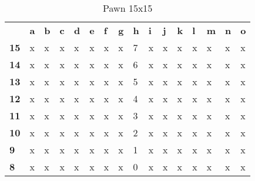 \documentclass{article}
\begin{document}
\begin{table}[H]
\centering
\caption{Pawn 15x15}
\label{my-label}
\begin{tabular}{llllllllllllllll}
                                 & \textbf{a} & \textbf{b} & \textbf{c} & \textbf{d} & \textbf{e} & \textbf{f} & \textbf{g} & \textbf{h} & \textbf{i} & \textbf{j} & \textbf{k} & \textbf{l} & \textbf{m} & \textbf{n} & \textbf{o} \\ \cline{2-16} 
\multicolumn{1}{l|}{\textbf{15}} & x          & x          & x          & x          & x          & x          & x          & 7          & x          & x          & x          & x          & x          & x          & x          \\
\multicolumn{1}{l|}{\textbf{14}} & x          & x          & x          & x          & x          & x          & x          & 6          & x          & x          & x          & x          & x          & x          & x          \\
\multicolumn{1}{l|}{\textbf{13}} & x          & x          & x          & x          & x          & x          & x          & 5          & x          & x          & x          & x          & x          & x          & x          \\
\multicolumn{1}{l|}{\textbf{12}} & x          & x          & x          & x          & x          & x          & x          & 4          & x          & x          & x          & x          & x          & x          & x          \\
\multicolumn{1}{l|}{\textbf{11}} & x          & x          & x          & x          & x          & x          & x          & 3          & x          & x          & x          & x          & x          & x          & x          \\
\multicolumn{1}{l|}{\textbf{10}} & x          & x          & x          & x          & x          & x          & x          & 2          & x          & x          & x          & x          & x          & x          & x          \\
\multicolumn{1}{l|}{\textbf{9}}  & x          & x          & x          & x          & x          & x          & x          & 1          & x          & x          & x          & x          & x          & x          & x          \\
\multicolumn{1}{l|}{\textbf{8}}  & x          & x          & x          & x          & x          & x          & x          & 0          & x          & x          & x          & x          & x          & x          & x          \\

\end{tabular}
\end{table}
\end{document}
